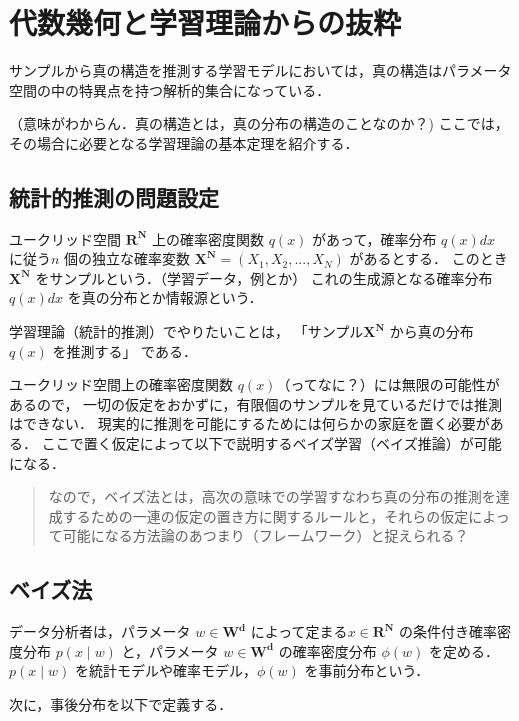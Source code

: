 \section{代数幾何と学習理論からの抜粋}

サンプルから真の構造を推測する学習モデルにおいては，真の構造はパラメータ空間の中の特異点を持つ解析的集合になっている．

（意味がわからん．真の構造とは，真の分布の構造のことなのか？) ここでは，その場合に必要となる学習理論の基本定理を紹介する．


\subsection{統計的推測の問題設定}
ユークリッド空間 \({\mathbf{R^N}}\) 上の確率密度関数 \({q(x)}\) があって，確率分布 \({q(x) dx}\) に従う\({n}\) 個の独立な確率変数
\(\mathbf{X^N}=(X_1, X_2,..., X_N)\) があるとする．
このとき \({\mathbf{X^N}}\) をサンプルという．（学習データ，例とか）
これの生成源となる確率分布 \({q(x) dx}\) を真の分布とか情報源という．

学習理論（統計的推測）でやりたいことは，
「サンプル\({\mathbf{X^N}}\)
から真の分布 \({q(x)}\) を推測する」
である．


ユークリッド空間上の確率密度関数 \({q(x)}\)（ってなに？）には無限の可能性があるので，
一切の仮定をおかずに，有限個のサンプルを見ているだけでは推測はできない．
現実的に推測を可能にするためには何らかの家庭を置く必要がある．
ここで置く仮定によって以下で説明するベイズ学習（ベイズ推論）が可能になる．


\begin{quote}
なので，ベイズ法とは，高次の意味での学習すなわち真の分布の推測を達成するための一連の仮定の置き方に関するルールと，それらの仮定によって可能になる方法論のあつまり（フレームワーク）と捉えられる？
\end{quote}



\subsection{ベイズ法}
データ分析者は，パラメータ \({w \in \mathbf{W^d}}\) によって定まる\({x \in \mathbf{R^N}}\) の条件付き確率密度分布 \({p(x \mid w) }\) と，パラメータ \({w \in \mathbf{W^d} }\) の確率密度分布  \({\phi(w)}\) を定める．
\({p(x\mid w)}\) を統計モデルや確率モデル，\({\phi(w)}\) を事前分布という．

次に，事後分布を以下で定義する．
